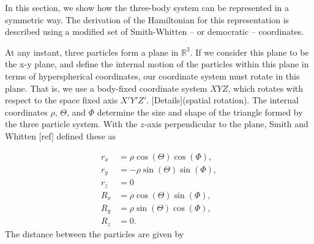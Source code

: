 \documentclass{article}
\numberwithin{equation}{section}
\numberwithin{figure}{section}
\begin{document}
In this section, we show how the three-body system can be represented in a symmetric way. The derivation of the Hamiltonian for this representation is described using a modified set of Smith-Whitten -- or democratic -- coordinates. 

At any instant, three particles form a plane in $\mathbb{R}^3$. If we consider this plane to be the x-y plane, and define the internal motion of the particles within this plane in terms of  hyperspherical coordinates, our coordinate system must rotate in this plane. That is, we use a body-fixed coordinate system $XYZ$, which rotates with respect to the space fixed axis $X'Y'Z'$. [Details](spatial rotation). The internal coordinates $\rho$, $\Theta$, and $\Phi$ determine the size and shape of the triangle formed by the three particle system. With the $z$-axis perpendicular to the plane, Smith and Whitten [ref] defined these as   

\begin{subequations}
\begin{align*}
	r_x &= \rho \cos(\Theta)\cos(\Phi),\\
	r_y &= -\rho \sin(\Theta)\sin(\Phi),\\
	r_z &= 0\\
	R_x &= \rho \cos(\Theta)\sin(\Phi),\\
	R_y &= \rho \sin(\Theta)\cos(\Phi),\\
	R_z &= 0.
\end{align*}   
\end{subequations}
The distance between the particles are given by
\end{document}
